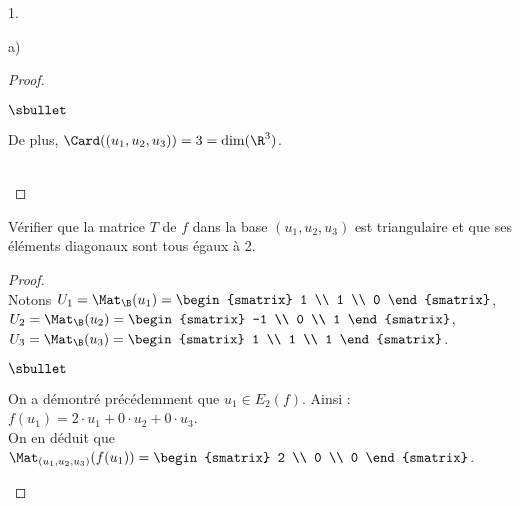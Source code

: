 \documentclass[11pt]{article}%
\begin{document}
\begin{noliste}{1.}
\begin{noliste}{a)}
\begin{proof}
\begin{noliste}{$\sbullet$}
      \item De plus, $\Card((u_1, u_2, u_3)) = 3 = \dim(\R^3)$. %
        ~\\[-1.2cm]
      \end{noliste}
      ~\\[-1.4cm]
    \end{proof}		




  \item Vérifier que la matrice $T$ de $f$ dans la base
    $(u_{1},u_{2},u_{3})$ est triangulaire et que ses éléments
    diagonaux sont tous égaux à 2.

    \begin{proof}~\\
      Notons $U_1 = \Mat_{\B}(u_1) =
        \begin{smatrix}
          1 \\
          1 \\
          0
        \end{smatrix}$, $U_2 = \Mat_{\B}(u_2) =
        \begin{smatrix}
          -1 \\
          0 \\
          1
        \end{smatrix}$, $U_3 = \Mat_{\B}(u_3) = 
        \begin{smatrix}
          1 \\
          1 \\
          1
        \end{smatrix}$.
      \begin{noliste}{$\sbullet$}
      \item On a démontré précédemment que $u_1 \in E_2(f)$. Ainsi : $
        f(u_1) = 2 \cdot u_1 + 0 \cdot u_2+0\cdot u_3 $.\\[.2cm]
        On en déduit que $\Mat_{(u_1, u_2, u_3)}(f(u_1)) =
        \begin{smatrix}
          2 \\
          0 \\
          0
        \end{smatrix}
        $.

\end{noliste}
\end{proof}
\end{noliste}
\end{noliste}
\end{document}
